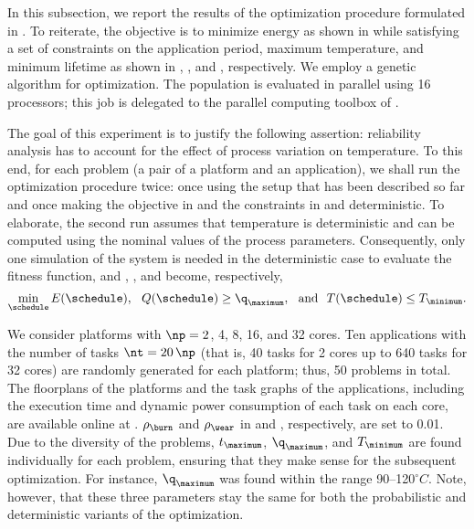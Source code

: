 In this subsection, we report the results of the optimization procedure
formulated in . To reiterate, the objective is to
minimize energy as shown in  while satisfying a set of
constraints on the application period, maximum temperature, and minimum lifetime
as shown in , , and
, respectively. We employ a genetic algorithm for
optimization. The population is evaluated in parallel using 16 processors; this
job is delegated to the parallel computing toolbox of  \cite{matlab}.

The goal of this experiment is to justify the following assertion: reliability
analysis has to account for the effect of process variation on temperature. To
this end, for each problem (a pair of a platform and an application), we shall
run the optimization procedure twice: once using the setup that has been
described so far and once making the objective in  and the
constraints in  and 
deterministic. To elaborate, the second run assumes that temperature is
deterministic and can be computed using the nominal values of the process
parameters. Consequently, only one simulation of the system is needed in the
deterministic case to evaluate the fitness function, and ,
, and  become,
respectively,
\[
  \min_{\schedule} E(\schedule), \hspace{0.7em}
  Q(\schedule) \geq \q_\maximum, \hspace{0.7em} \text{and} \hspace{0.7em}
  T(\schedule) \leq T_\minimum.
\]

We consider platforms with $\np = 2$, 4, 8, 16, and 32 cores. Ten applications
with the number of tasks $\nt = 20 \, \np$ (that is, 40 tasks for 2 cores up to
640 tasks for 32 cores) are randomly generated for each platform; thus, 50
problems in total. The floorplans of the platforms and the task graphs of the
applications, including the execution time and dynamic power consumption of each
task on each core, are available online at \cite{sources}. $\rho_\burn$ and
$\rho_\wear$ in  and ,
respectively, are set to 0.01. Due to the diversity of the problems,
$t_\maximum$, $\q_\maximum$, and $T_\minimum$ are found individually for each
problem, ensuring that they make sense for the subsequent optimization. For
instance, $\q_\maximum$ was found within the range 90--120${}^\circ{}C$. Note,
however, that these three parameters stay the same for both the probabilistic
and deterministic variants of the optimization.

